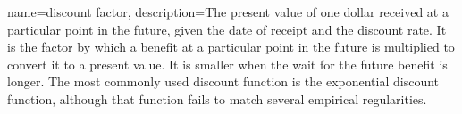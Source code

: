 

{
name=discount factor,
description={The present value of one dollar received at a particular point in the future, given the date of receipt and the \gls{discount rate}. It is the factor by which a benefit at a particular point in the future is multiplied to convert it to a present value. It is smaller when the wait for the future benefit is longer.  The most commonly used discount function is the exponential discount function, although that function fails to match several empirical regularities.  }
}


